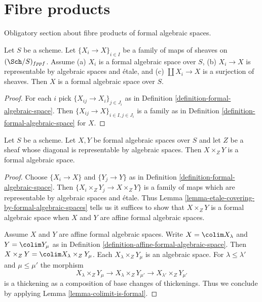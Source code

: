 \section{Fibre products}
\label{section-fibre-products}

\noindent
Obligatory section about fibre products of formal algebraic spaces.

\begin{lemma}
\label{lemma-etale-covering-by-formal-algebraic-spaces}
Let $S$ be a scheme. Let $\{X_i \to X\}_{i \in I}$ be a family of maps
of sheaves on $(\Sch/S)_{fppf}$. Assume (a) $X_i$ is a
formal algebraic space over $S$, (b) $X_i \to X$ is representable
by algebraic spaces and \'etale, and (c) $\coprod X_i \to X$
is a surjection of sheaves. Then $X$ is a formal algebraic space
over $S$.
\end{lemma}

\begin{proof}
For each $i$ pick $\{X_{ij} \to X_i\}_{j \in J_i}$ as in
Definition \ref{definition-formal-algebraic-space}.
Then $\{X_{ij} \to X\}_{i \in I, j \in J_i}$ is a family
as in Definition \ref{definition-formal-algebraic-space}
for $X$.
\end{proof}

\begin{lemma}
\label{lemma-fibre-products-general}
Let $S$ be a scheme. Let $X, Y$ be formal algebraic spaces over $S$
and let $Z$ be a sheaf whose diagonal is representable by
algebraic spaces. Then $X \times_Z Y$ is a formal algebraic space.
\end{lemma}

\begin{proof}
Choose $\{X_i \to X\}$ and $\{Y_j \to Y\}$ as in
Definition \ref{definition-formal-algebraic-space}.
Then $\{X_i \times_Z Y_j \to X \times_Z Y\}$ is a family
of maps which are representable by algebraic spaces and \'etale.
Thus Lemma \ref{lemma-etale-covering-by-formal-algebraic-spaces}
tells us it suffices to show that $X \times_Z Y$ is a formal
algebraic space when $X$ and $Y$ are affine formal algebraic spaces.

\medskip\noindent
Assume $X$ and $Y$ are affine formal algebraic spaces.
Write $X = \colim X_\lambda$ and $Y = \colim Y_\mu$ as
in Definition \ref{definition-affine-formal-algebraic-space}.
Then $X \times_Z Y = \colim X_\lambda \times_Z Y_\mu$.
Each $X_\lambda \times_Z Y_\mu$ is an algebraic space.
For $\lambda \leq \lambda'$ and $\mu \leq \mu'$ the morphism
$$
X_\lambda \times_Z Y_\mu \to
X_\lambda \times_Z Y_{\mu'} \to
X_{\lambda'} \times_Z Y_{\mu'}
$$
is a thickening as a composition of base changes of thickenings.
Thus we conclude by applying Lemma \ref{lemma-colimit-is-formal}.
\end{proof}

